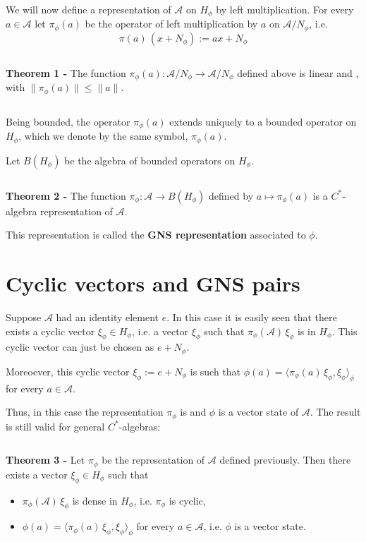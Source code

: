 \documentclass[12pt]{article}
\begin{document}
We will now define a representation of $\mathcal{A}$ on $H_{\phi}$ by left multiplication. For every $a \in \mathcal{A}$ let $\pi_{\phi}(a)$ be the operator of left multiplication by $a$ on $\mathcal{A}/N_{\phi}$, i.e.
\begin{displaymath}
\pi(a)\,(x+ N_{\phi}) := ax+N_{\phi}
\end{displaymath}

$\,$

{\bf Theorem 1 -} The function $\pi_{\phi}(a):\mathcal{A}/N_{\phi} \longrightarrow \mathcal{A}/N_{\phi}$ defined above is linear and , with $\|\pi_{\phi}(a)\| \leq \|a\|$.

$\;$

Being bounded, the operator $\pi_{\phi}(a)$ extends uniquely to a bounded operator on $H_{\phi}$, which we denote by the same symbol, $\pi_{\phi}(a)$.

Let $B(H_{\phi})$ be the algebra of bounded operators on $H_{\phi}$.

$\,$

{\bf Theorem 2 -} The function $\pi_{\phi}:\mathcal{A} \longrightarrow B(H_{\phi})$ defined by $a \mapsto \pi_{\phi}(a)$ is a $C^*$-algebra representation of $\mathcal{A}$.

This representation is called the {\bf GNS representation} associated to $\phi$.

\section{Cyclic vectors and GNS pairs}

Suppose $\mathcal{A}$ had an identity element $e$. In this case it is easily seen that there exists a cyclic vector $\xi_{\phi} \in H_{\phi}$, i.e. a vector $\xi_{\phi}$ such that $\pi_{\phi}(\mathcal{A})\,\xi_{\phi}$ is  in $H_{\phi}$. This cyclic vector can just be chosen as $e + N_{\phi}$.

Moreoever, this cyclic vector $\xi_{\phi} :=e + N_{\phi}$ is such that $\phi(a) = \langle \pi_{\phi}(a)\,\xi_{\phi}, \xi_{\phi}\rangle_{\phi}$ for every $a \in \mathcal{A}$.

Thus, in this case the representation $\pi_{\phi}$ is  and $\phi$ is a vector state of $\mathcal{A}$. The result is still valid for general $C^*$-algebras:

$\,$

{\bf Theorem 3 -} Let $\pi_{\phi}$ be the representation of $\mathcal{A}$ defined previously. Then there exists a vector $\xi_{\phi} \in H_{\phi}$ such that
\begin{itemize}
\item $\pi_{\phi}(\mathcal{A})\,\xi_{\phi}$ is dense in $H_{\phi}$, i.e. $\pi_{\phi}$ is cyclic,
\item $\phi(a) = \langle \pi_{\phi}(a)\,\xi_{\phi}, \xi_{\phi}\rangle_{\phi}$ for every $a \in \mathcal{A}$, i.e. $\phi$ is a vector state.
\end{itemize}
\end{document}
